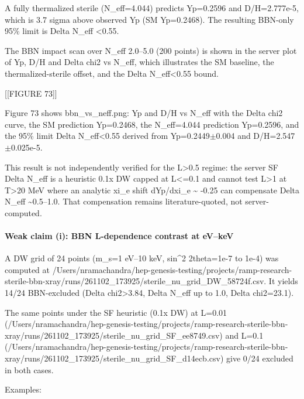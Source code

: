 \documentclass[11pt,a4paper]{article}
\begin{document}
A fully thermalized sterile (N\_eff=4.044) predicts Yp=0.2596 and D/H=2.777e-5, which is 3.7 sigma above observed Yp (SM Yp=0.2468). The resulting BBN-only 95\% limit is Delta N\_eff \textless{}0.55.

The BBN impact scan over N\_eff 2.0--5.0 (200 points) is shown in the server plot of Yp, D/H and Delta chi2 vs N\_eff, which illustrates the SM baseline, the thermalized-sterile offset, and the Delta N\_eff\textless{}0.55 bound.

[[FIGURE 73]]

Figure 73 shows bbn\_vs\_neff.png: Yp and D/H vs N\_eff with the Delta chi2 curve, the SM prediction Yp=0.2468, the N\_eff=4.044 prediction Yp=0.2596, and the 95\% limit Delta N\_eff\textless{}0.55 derived from Yp=0.2449$\pm$0.004 and D/H=2.547$\pm$0.025e-5.

This result is not independently verified for the L\textgreater{}0.5 regime: the server SF Delta N\_eff is a heuristic 0.1x DW capped at L\textless{}=0.1 and cannot test L\textgreater{}1 at T\textgreater{}20 MeV where an analytic xi\_e shift dYp/dxi\_e \textasciitilde{} -0.25 can compensate Delta N\_eff \textasciitilde{}0.5--1.0. That compensation remains literature-quoted, not server-computed.

\paragraph{Weak claim (i): BBN L-dependence contrast at eV--keV}
A DW grid of 24 points (m\_s=1 eV--10 keV, sin\textasciicircum{}2 2theta=1e-7 to 1e-4) was computed at /Users/nramachandra/hep-genesis-testing/projects/ramp-research-sterile-bbn-xray/runs/261102\_173925/sterile\_nu\_grid\_DW\_58724f.csv. It yields 14/24 BBN-excluded (Delta chi2\textgreater{}3.84, Delta N\_eff up to 1.0, Delta chi2=23.1).

The same points under the SF heuristic (0.1x DW) at L=0.01 (/Users/nramachandra/hep-genesis-testing/projects/ramp-research-sterile-bbn-xray/runs/261102\_173925/sterile\_nu\_grid\_SF\_ee8749.csv) and L=0.1 (/Users/nramachandra/hep-genesis-testing/projects/ramp-research-sterile-bbn-xray/runs/261102\_173925/sterile\_nu\_grid\_SF\_d14ecb.csv) give 0/24 excluded in both cases.

Examples:
\end{document}
